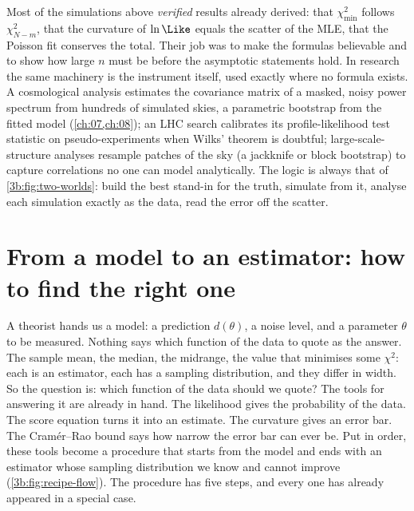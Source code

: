 \begin{inpractice}
Most of the simulations above \emph{verified} results already derived:
that $\chi^2_{\min}$ follows $\chi^2_{N-m}$, that the curvature
of $\ln\Like$ equals the scatter of the MLE, that the Poisson fit conserves
the total. Their job was to make the formulas believable and to show how
large $n$ must be before the asymptotic statements hold. In research the
same machinery is the instrument itself, used exactly where no formula
exists. A cosmological analysis estimates the covariance matrix of a
masked, noisy power spectrum from hundreds of simulated skies, a
parametric bootstrap from the fitted model (\cref{ch:07,ch:08}); an LHC
search calibrates its profile-likelihood test statistic on pseudo-experiments
when Wilks' theorem is doubtful; large-scale-structure analyses resample
patches of the sky (a jackknife or block bootstrap) to capture
correlations no one can model analytically. The logic is always that of
\cref{3b:fig:two-worlds}: build the best stand-in for the truth, simulate
from it, analyse each simulation exactly as the data, read the error off the
scatter.
\end{inpractice}
\section{From a model to an estimator: how to find the right one}
\label{3b:sec:recipe}

A theorist hands us a model: a prediction $d(\theta)$, a noise level, and a
parameter $\theta$ to be measured. Nothing says which function of the data
to quote as the answer. The sample mean, the median, the midrange, the
value that minimises some $\chi^2$: each is an estimator, each has a
sampling distribution, and they differ in width. So the question is: which
function of the data should we quote? The tools for answering it are
already in hand. The likelihood gives the probability of the data. The
score equation turns it into an estimate. The curvature gives an error bar.
The Cram\'er--Rao bound says how narrow the error bar can ever be. Put in
order, these tools become a procedure that starts from the model and ends
with an estimator whose sampling distribution we know and cannot improve
(\cref{3b:fig:recipe-flow}). The procedure has five steps, and every one has
already appeared in a special case.

